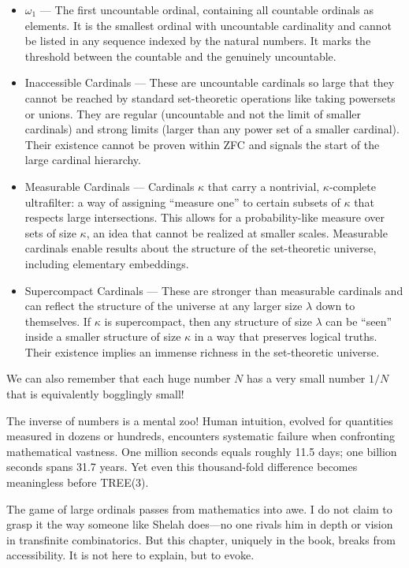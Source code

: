 \begin{itemize}
    \item $\omega_1$ — The first uncountable ordinal, containing all countable ordinals as elements. It is the smallest ordinal with uncountable cardinality and cannot be listed in any sequence indexed by the natural numbers. It marks the threshold between the countable and the genuinely uncountable.
    
    \item Inaccessible Cardinals — These are uncountable cardinals so large that they cannot be reached by standard set-theoretic operations like taking powersets or unions. They are regular (uncountable and not the limit of smaller cardinals) and strong limits (larger than any power set of a smaller cardinal). Their existence cannot be proven within ZFC and signals the start of the large cardinal hierarchy.
    
    \item Measurable Cardinals — Cardinals $\kappa$ that carry a nontrivial, $\kappa$-complete ultrafilter: a way of assigning ``measure one'' to certain subsets of $\kappa$ that respects large intersections. This allows for a probability-like measure over sets of size $\kappa$, an idea that cannot be realized at smaller scales. Measurable cardinals enable results about the structure of the set-theoretic universe, including elementary embeddings.
    
    \item Supercompact Cardinals — These are stronger than measurable cardinals and can reflect the structure of the universe at any larger size $\lambda$ down to themselves. If $\kappa$ is supercompact, then any structure of size $\lambda$ can be ``seen'' inside a smaller structure of size $\kappa$ in a way that preserves logical truths. Their existence implies an immense richness in the set-theoretic universe.
\end{itemize}

We can also remember that each huge number $N$ has a very small number $1/N$ that is equivalently bogglingly small!

The inverse of numbers is a mental zoo! Human intuition, evolved for quantities measured in dozens or hundreds, encounters systematic failure when confronting mathematical vastness. One million seconds equals roughly 11.5 days; one billion seconds spans 31.7 years. Yet even this thousand-fold difference becomes meaningless before TREE(3).

The game of large ordinals passes from mathematics into awe. I do not claim to grasp it the way someone like Shelah does—no one rivals him in depth or vision in transfinite combinatorics. But this chapter, uniquely in the book, breaks from accessibility. It is not here to explain, but to evoke.

